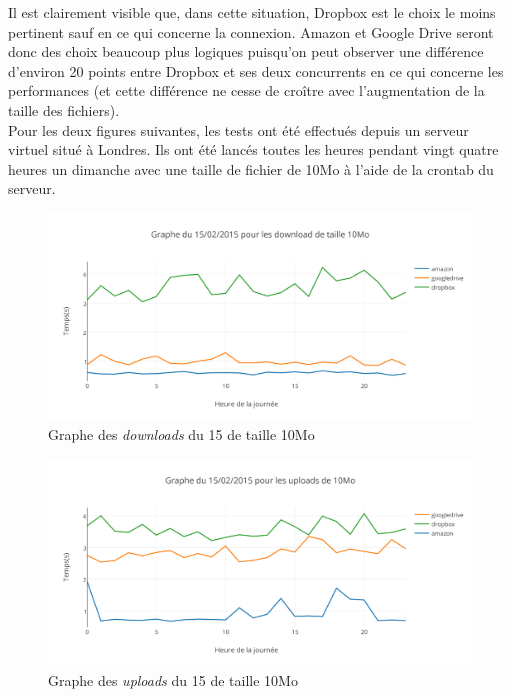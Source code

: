 \documentclass[10pt]{article}
\begin{document}
Il est clairement visible que, dans cette situation, Dropbox est le choix le
moins pertinent sauf en ce qui concerne la connexion. Amazon et Google Drive
seront donc des choix beaucoup plus logiques puisqu'on peut observer une
différence d'environ 20 points entre Dropbox et ses deux concurrents en ce qui
concerne les performances (et cette différence ne cesse de croître avec
l'augmentation de la taille des fichiers).\\

Pour les deux figures suivantes, les tests ont été effectués depuis un serveur
virtuel situé à Londres. Ils ont été lancés toutes les heures pendant vingt
quatre heures un dimanche avec une taille de fichier de 10Mo à l'aide de la
crontab du serveur.


\begin{figure}[h] \centering
\includegraphics[scale=0.7]{graphe_du_15022015_pour_les_download_de_taille_10mo.png}
\caption{Graphe des \textit{downloads} du 15 de taille 10Mo} \end{figure}

\newpage

\begin{figure}[h] \centering
\includegraphics[scale=0.7]{graphe_du_15022015_pour_les_uploads_de_10mo.png}
\caption{Graphe des \textit{uploads} du 15 de taille 10Mo} \end{figure}
\end{document}
